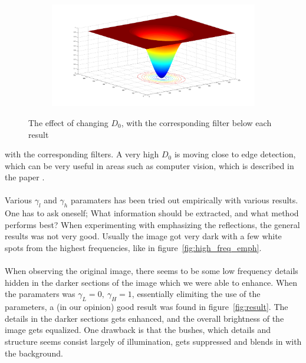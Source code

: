 \begin{figure}[h!]
\begin{subfigure}[b]{0.6\textwidth}
				\caption{}
				\label{fig:low_sigma_filter}
			\end{subfigure}%
			\begin{subfigure}[b]{0.6\textwidth}
				\includegraphics[width=\textwidth]{pics/high_sigma_filter.png}
				\caption{}
				\label{fig:high_sigma_filter}
			\end{subfigure}
			\label{fig:sigma}
		\caption{The effect of changing $D_0$, with the corresponding filter below each result}				
		\end{figure}
		with the corresponding filters. A very high $D_0$ is moving close to edge detection,
		which can be very useful in areas such as computer vision, which is described in 
		the paper \cite{Fan20111468}.\\
		\\
		Various $\gamma_l$ and $\gamma_h$ paramaters has been tried out empirically with 
		various results. One has to ask oneself; What information should be extracted, and what 
		method performs best? When experimenting with emphasizing the reflections, the 
		general results was not very good. Usually the image got very dark with a few white
		spots from the highest frequencies, like in figure~\ref{fig:high_freq_emph}.\\
		\\
		When observing the original image, there seems to be some 
		low frequency details hidden in the darker sections of the image which we were able
		to enhance. When the paramaters was $\gamma_L = 0,~\gamma_H = 1$,
		essentially elimiting the use of the parameters, a (in our opinion) good result was 
		found in figure~\ref{fig:result}. The details in the darker sections gets enhanced, 
		and the overall brightness
		of the image gets equalized. One drawback is that the bushes, which details 
		and structure seems consist
		largely of illumination, gets suppressed and blends in with the background.\\
